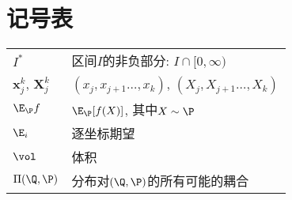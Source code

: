 \section*{记号表}

\begin{tabular}{p{} p{}}
\hline
	$I^*$ & 区间$I$的非负部分: $I \cap [0, \infty)$ \\
	$\bm x_j^k$, $\bm X_j^k$ & $(x_j, x_{j+1} \dots, x_k)$, $(X_j, X_{j+1} \dots, X_k)$ \\
	$\E_{\P} f$ & $\E_{\P} [f(X)]$, 其中$X \sim \P$ \\
	$\E_i$ & 逐坐标期望 \\
	$\vol$ & 体积 \\
	$\Pi(\Q, \P)$ & 分布对$(\Q, \P)$的所有可能的耦合
\end{tabular}
